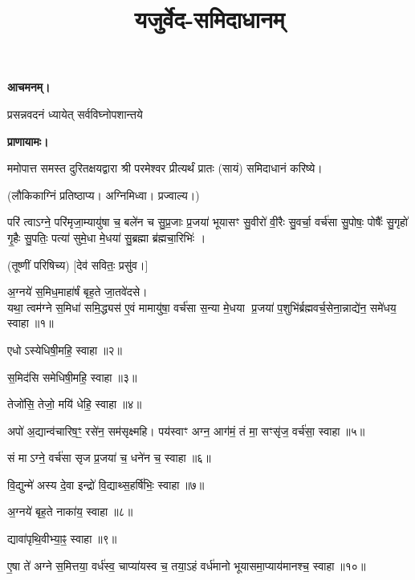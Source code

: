 \setmainfont[Script=Devanagari,Mapping=tex-text,Mapping=devanagarinumerals,AutoFakeBold=2.0]{Siddhanta}
\title{\Huge यजुर्वेद-समिदाधानम्}
\date{}
\maketitle
\tableofcontents 

\clearpage
{}

\textbf{आचमनम्।}

{प्रसन्नवदनं ध्यायेत् सर्वविघ्नोपशान्तये}
 
\textbf{प्राणायामः।} 

ममोपात्त समस्त दुरितक्षयद्वारा श्री परमेश्वर प्रीत्यर्थं प्रातः (सायं) समिदाधानं करिष्ये।

(लौकिकाग्निं प्रतिष्ठाप्य। अग्निमिध्वा। प्रज्वाल्य।)

परि॑ त्वाऽग्ने॒ परि॑मृजा॒म्यायु॑षा च॒ बले॑न च सु॒प्र॒जाः प्र॒जया॑ भूयासꣳ सु॒वीरो॑ वी॒रैः सु॒वर्चा॒ वर्च॑सा सु॒पोषः॒ पोषैः᳚ सु॒गृहो॑ गृ॒हैः सु॒पतिः॒ पत्या॑ सुमे॒धा मे॒धया॑ सु॒ब्रह्मा ब्र॑ह्मचा॒रिभिः॑ ।

(तूष्णीं परिषिच्य) [देव॑ सवितः॒ प्रसु॑व।]

अ॒ग्नये॑ स॒मिध॒माहा॑र्\mbox{}षं बृह॒ते जा॒तवे॑दसे।\\
यथा॒ त्वम॑ग्ने स॒मिधा॑ समि॒द्ध्यस॑ ए॒वं मामायु॑षा॒ वर्च॑सा स॒न्या मे॒धया प्र॒जया॑ प॒शुभि॑र्ब्रह्मवर्च॒सेना॒न्नाद्ये॑न॒ समे॑धय॒ स्वाहा॥१॥

एधोऽस्येधिषी॒महि॒ स्वाहा॥२॥

स॒मिद॑सि समेधिषी॒महि॒ स्वाहा॥३॥

तेजो॑सि॒ तेजो॒ मयि॑ धेहि॒ स्वाहा॥४॥

अपो॑ अ॒द्यान्व॑चारिष॒ꣳ॒ रसे॑न॒ सम॑सृक्ष्महि। पय॑स्वाꣳ अग्न॒ आग॑मं॒ तं मा॒ सꣳसृ॑ज॒ वर्च॑सा॒ स्वाहा॥५॥

सं माऽग्ने॒ वर्च॑सा सृज प्र॒जया॑ च॒ धने॑न च॒ स्वाहा॥६॥

वि॒द्युन्मे॑ अस्य दे॒वा इन्द्रो॑ वि॒द्याथ्स॒हर्\mbox{}षि॑भिः॒ स्वाहा॥७॥

अ॒ग्नये॑ बृह॒ते नाका॑य॒ स्वाहा॥८॥

द्यावा॑पृथि॒वीभ्या॒ꣴ॒ स्वाहा॥९॥

ए॒षा ते॑ अग्ने स॒मित्तया॒ वर्ध॑स्व॒ चाप्या॑यस्व च॒ तया॒ऽहं वर्ध॑मानो भूयासमा॒प्याय॑मानश्च॒ स्वाहा॥१०॥

